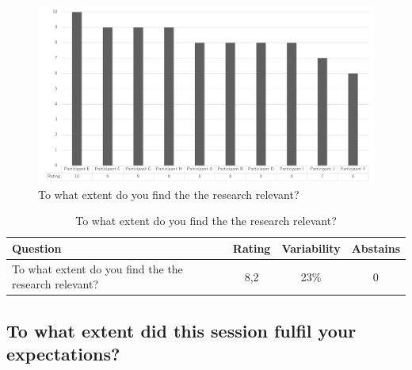 \begin{figure}[H]
	\centering
	\includegraphics[width=0.9\linewidth]{images/validationresult_generalresearchrelevance}
	\caption[To what extent do you find the the research relevant?]{To what extent do you find the the research relevant?}
	\label{fig:validationrelevancegeneric}
\end{figure}
\begin{table}[H]
	\centering
	\begin{tabular}{p{}ccc}
		\toprule
		\textbf{Question} & \textbf{Rating} & \textbf{Variability} & \textbf{Abstains} \\
		\midrule
		To what extent do you find the the research relevant? & 8,2 & 23\% & 0 \\%
		\bottomrule
	\end{tabular}%
	\caption[To what extent do you find the the research relevant?]{To what extent do you find the the research relevant?}
	\label{tab:validationrelevancegeneric}%
\end{table}%

\subsection{To what extent did this session fulfil your expectations?}
\label{sub:fulfilexpectations}

